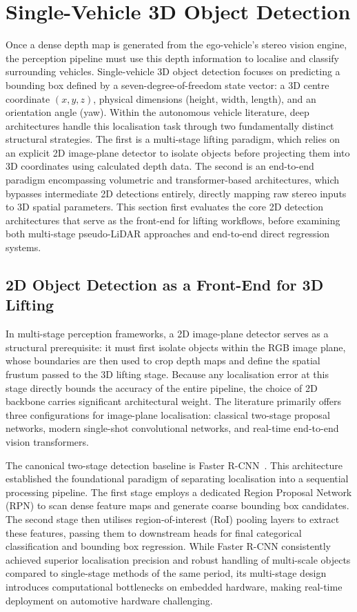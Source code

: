 \section{Single-Vehicle 3D Object Detection}
\label{sec:single3d}

Once a dense depth map is generated from the ego-vehicle's stereo vision engine,
the perception pipeline must use this depth information to localise and classify
surrounding vehicles. Single-vehicle 3D object detection focuses on predicting a
bounding box defined by a seven-degree-of-freedom state vector: a 3D centre
coordinate $(x, y, z)$, physical dimensions (height, width, length), and an
orientation angle (yaw). Within the autonomous vehicle literature, deep
architectures handle this localisation task through two fundamentally distinct
structural strategies. The first is a multi-stage lifting paradigm, which relies
on an explicit 2D image-plane detector to isolate objects before projecting them
into 3D coordinates using calculated depth data. The second is an end-to-end
paradigm encompassing volumetric and transformer-based architectures, which
bypasses intermediate 2D detections entirely, directly mapping raw stereo inputs
to 3D spatial parameters. This section first evaluates the core 2D detection
architectures that serve as the front-end for lifting workflows, before examining
both multi-stage pseudo-LiDAR approaches and end-to-end direct regression
systems.

\subsection{2D Object Detection as a Front-End for 3D Lifting}

In multi-stage perception frameworks, a 2D image-plane detector serves as a
structural prerequisite: it must first isolate objects within the RGB image
plane, whose boundaries are then used to crop depth maps and define the spatial
frustum passed to the 3D lifting stage. Because any localisation error at this
stage directly bounds the accuracy of the entire pipeline, the choice of 2D
backbone carries significant architectural weight. The literature primarily
offers three configurations for image-plane localisation: classical two-stage
proposal networks, modern single-shot convolutional networks, and real-time
end-to-end vision transformers.

The canonical two-stage detection baseline is Faster R-CNN~\cite{ren2015}. This
architecture established the foundational paradigm of separating localisation into
a sequential processing pipeline. The first stage employs a dedicated Region
Proposal Network (RPN) to scan dense feature maps and generate coarse bounding
box candidates. The second stage then utilises region-of-interest (RoI) pooling
layers to extract these features, passing them to downstream heads for final
categorical classification and bounding box regression. While Faster R-CNN
consistently achieved superior localisation precision and robust handling of
multi-scale objects compared to single-stage methods of the same period, its
multi-stage design introduces computational bottlenecks on embedded hardware,
making real-time deployment on automotive hardware challenging.

